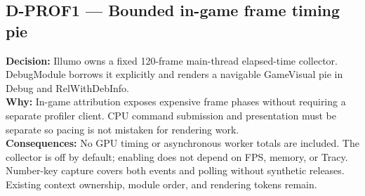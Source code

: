 \subsection*{D-PROF1 --- Bounded in-game frame timing pie}
\begin{decisionbox}[title={D-PROF1 \quad 2026-09-14}]
\textbf{Decision:} Illumo owns a fixed 120-frame main-thread elapsed-time
collector. DebugModule borrows it explicitly and renders a navigable GameVisual
pie in Debug and RelWithDebInfo.\\
\textbf{Why:} In-game attribution exposes expensive frame phases without
requiring a separate profiler client. CPU command submission and presentation
must be separate so pacing is not mistaken for rendering work.\\
\textbf{Consequences:} No GPU timing or asynchronous worker totals are included.
The collector is off by default; enabling does not depend on FPS, memory, or
Tracy. Number-key capture covers both events and polling without synthetic
releases. Existing context ownership, module order, and rendering tokens remain.
\end{decisionbox}

